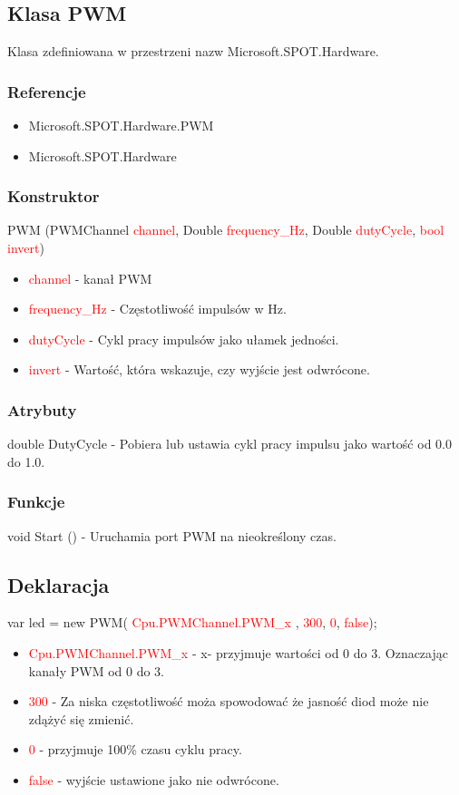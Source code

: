 \documentclass{article}
\begin{document}
\subsection{Klasa PWM}
Klasa zdefiniowana w przestrzeni nazw Microsoft.SPOT.Hardware. 
\subsubsection{Referencje}
\begin{itemize}
\item Microsoft.SPOT.Hardware.PWM
\item Microsoft.SPOT.Hardware
\end{itemize}
\subsubsection{Konstruktor}
PWM (PWMChannel \textcolor{red}{channel}, Double \textcolor{red}{frequency\_Hz}, Double \textcolor{red}{dutyCycle},  \textcolor{red}{bool invert})
\begin{itemize}
\item \textcolor{red}{channel} - kanał PWM
\item \textcolor{red}{frequency\_Hz} - Częstotliwość impulsów w Hz.
\item \textcolor{red}{dutyCycle} - Cykl pracy impulsów jako ułamek jedności.
\item \textcolor{red}{invert} - Wartość, która wskazuje, czy wyjście jest odwrócone.
\end{itemize}
\subsubsection{Atrybuty}
double DutyCycle - Pobiera lub ustawia cykl pracy impulsu jako wartość od 0.0 do 1.0.
\subsubsection{Funkcje}
void Start () - Uruchamia port PWM na nieokreślony czas.
\subsection{Deklaracja}
 var led = new PWM(\space \textcolor{red}{ Cpu.PWMChannel.PWM\_x },\space \textcolor{red}{ 300},\space \textcolor{red}{ 0}, \space \textcolor{red}{ false});
\begin{itemize}
\item \textcolor{red}{Cpu.PWMChannel.PWM\_x} - x- przyjmuje wartości od 0 do 3. Oznaczając kanały PWM od 0 do 3.
\item \textcolor{red}{300} - Za niska częstotliwość moża spowodować że jasność diod może nie zdążyć się zmienić.
\item \textcolor{red}{0} - przyjmuje 100\% czasu cyklu pracy.
\item \textcolor{red}{false} - wyjście ustawione jako nie odwrócone.
\end{itemize}
\end{document}
